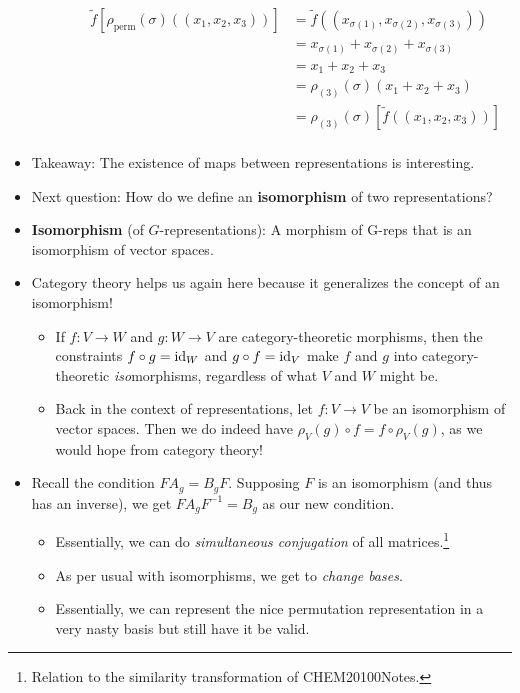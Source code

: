 \documentclass[../notes.tex]{subfiles}
\begin{document}
\begin{itemize}
\begin{itemize}
\begin{itemize}
\begin{align*}
                \tilde{f}[\rho_\text{perm}(\sigma)((x_1,x_2,x_3))] &= \tilde{f}((x_{\sigma(1)},x_{\sigma(2)},x_{\sigma(3)}))\\
                &= x_{\sigma(1)}+x_{\sigma(2)}+x_{\sigma(3)}\\
                &= x_1+x_2+x_3\tag*{Commutativity of addition}\\
                &= \rho_{(3)}(\sigma)(x_1+x_2+x_3)\\
                &= \rho_{(3)}(\sigma)[\tilde{f}((x_1,x_2,x_3))]\\
            \end{align*}
        \end{itemize}
    \end{itemize}
    \item Takeaway: The existence of maps between representations is interesting.
    \item Next question: How do we define an \textbf{isomorphism} of two representations?
    \item \textbf{Isomorphism} (of $G$-representations): A morphism of G-reps that is an isomorphism of vector spaces.
    \item Category theory helps us again here because it generalizes the concept of an isomorphism!
    \begin{itemize}
        \item If $f:V\to W$ and $g:W\to V$ are category-theoretic morphisms, then the constraints $f\circ g=\operatorname{id}_W$ and $g\circ f=\operatorname{id}_V$ make $f$ and $g$ into category-theoretic \emph{iso}morphisms, regardless of what $V$ and $W$ might be.
        \item Back in the context of representations, let $f:V\to V$ be an isomorphism of vector spaces. Then we do indeed have $\rho_V(g)\circ f=f\circ\rho_V(g)$, as we would hope from category theory!
    \end{itemize}
    \item Recall the condition $FA_g=B_gF$. Supposing $F$ is an isomorphism (and thus has an inverse), we get $FA_gF^{-1}=B_g$ as our new condition.
    \begin{itemize}
        \item Essentially, we can do \emph{simultaneous conjugation} of all matrices.\footnote{Relation to the similarity transformation of CHEM20100Notes.}
        \item As per usual with isomorphisms, we get to \emph{change bases}.
        \item Essentially, we can represent the nice permutation representation in a very nasty basis but still have it be valid.

\end{itemize}
\end{itemize}
\end{document}
